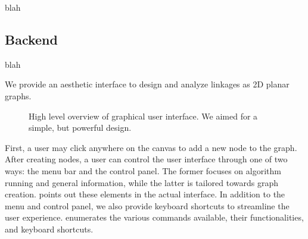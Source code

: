 \documentclass[aps,final,twocolumn,letterpaper,nofootinbib]{revtex4-1}
\begin{document}
blah
 
\subsection{Backend}
blah

We provide an aesthetic interface
to design and analyze linkages as 2D planar graphs.

\begin{figure}[ht]
\caption{High level overview of graphical user interface.
We aimed for a simple, but powerful design.}
\label{fig:ui}
\end{figure}

First, a user may click anywhere on the canvas to add a new node to the graph.
After creating nodes,
a user can control the user interface through one of two ways:
the menu bar and the control panel.
The former focuses on algorithm running and general information,
while the latter is tailored towards graph creation.
 points out these elements in the actual interface.
In addition to the menu and control panel,
we also provide keyboard shortcuts to streamline the user experience.
 enumerates the various commands available,
their functionalities, and keyboard shortcuts.
\end{document}
